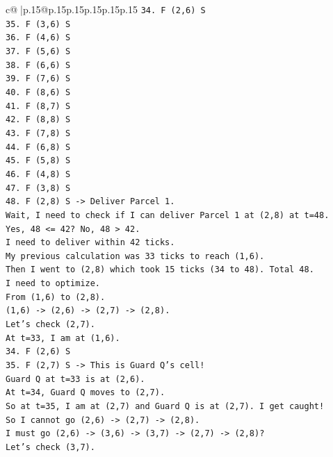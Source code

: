 \documentclass{article}
\begin{document}
{\begin{supertabular}{c@{$\;$}|p{.15\linewidth}@{}p{.15\linewidth}p{.15\linewidth}p{.15\linewidth}p{.15\linewidth}p{.15\linewidth}}
{{{\texttt{34. F (2,6) S} \\
\texttt{35. F (3,6) S} \\
\texttt{36. F (4,6) S} \\
\texttt{37. F (5,6) S} \\
\texttt{38. F (6,6) S} \\
\texttt{39. F (7,6) S} \\
\texttt{40. F (8,6) S} \\
\texttt{41. F (8,7) S} \\
\texttt{42. F (8,8) S} \\
\texttt{43. F (7,8) S} \\
\texttt{44. F (6,8) S} \\
\texttt{45. F (5,8) S} \\
\texttt{46. F (4,8) S} \\
\texttt{47. F (3,8) S} \\
\texttt{48. F (2,8) S {-}> Deliver Parcel 1.} \\
\texttt{Wait, I need to check if I can deliver Parcel 1 at (2,8) at t=48.} \\
\texttt{Yes, 48 <= 42? No, 48 > 42.} \\
\texttt{I need to deliver within 42 ticks.} \\
\texttt{My previous calculation was 33 ticks to reach (1,6).} \\
\texttt{Then I went to (2,8) which took 15 ticks (34 to 48). Total 48.} \\
\texttt{I need to optimize.} \\
\texttt{From (1,6) to (2,8).} \\
\texttt{(1,6) {-}> (2,6) {-}> (2,7) {-}> (2,8).} \\
\texttt{Let's check (2,7).} \\
\texttt{At t=33, I am at (1,6).} \\
\texttt{34. F (2,6) S} \\
\texttt{35. F (2,7) S {-}> This is Guard Q's cell!} \\
\texttt{Guard Q at t=33 is at (2,6).} \\
\texttt{At t=34, Guard Q moves to (2,7).} \\
\texttt{So at t=35, I am at (2,7) and Guard Q is at (2,7). I get caught!} \\
\texttt{So I cannot go (2,6) {-}> (2,7) {-}> (2,8).} \\
\texttt{I must go (2,6) {-}> (3,6) {-}> (3,7) {-}> (2,7) {-}> (2,8)?} \\
\texttt{Let's check (3,7).} \\
}}}
\end{supertabular}}
\end{document}
